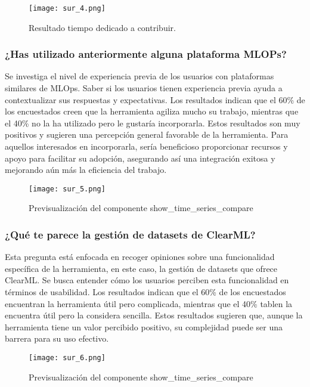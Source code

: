 \begin{figure}[!h]
    \centering
    \texttt{[image: sur\_4.png]}
    \caption{Resultado tiempo dedicado a contribuir.}
    \label{fig:sur_4}
\end{figure}


\subsubsection{¿Has utilizado anteriormente alguna plataforma MLOPs?}

Se investiga el nivel de experiencia previa de los usuarios con plataformas 
similares de MLOps. Saber si los usuarios tienen experiencia previa ayuda 
a contextualizar sus respuestas y expectativas. Los resultados indican que el 60\% de 
los encuestados creen que la herramienta agiliza mucho su trabajo, mientras que el 40\% no 
la ha utilizado pero le gustaría incorporarla. Estos resultados son muy positivos y sugieren una 
percepción general favorable de la herramienta. Para aquellos interesados 
en incorporarla, sería beneficioso proporcionar recursos y apoyo para facilitar 
su adopción, asegurando así una integración exitosa y mejorando aún más la 
eficiencia del trabajo.

\begin{figure}[!h]
    \centering
    \texttt{[image: sur\_5.png]}
    \caption{Previsualización del componente show\_time\_series\_compare}
    \label{fig:sur_5}
\end{figure}

\subsubsection{¿Qué te parece la gestión de datasets de ClearML?} 

Esta pregunta está 
enfocada en recoger opiniones sobre una funcionalidad específica de la 
herramienta, en este caso, la gestión de datasets que ofrece ClearML. 
Se busca entender cómo los usuarios perciben esta funcionalidad en términos 
de usabilidad.
Los resultados indican que el 60\% de los encuestados encuentran la herramienta 
útil pero complicada, mientras que el 40\% tablen la encuentra útil pero la considera 
sencilla. Estos resultados sugieren que, aunque la herramienta tiene un valor 
percibido positivo, su complejidad puede ser una barrera para su uso efectivo. 

\begin{figure}[!h]
    \centering
    \texttt{[image: sur\_6.png]}
    \caption{Previsualización del componente show\_time\_series\_compare}
    \label{fig:sur_6}
\end{figure}


